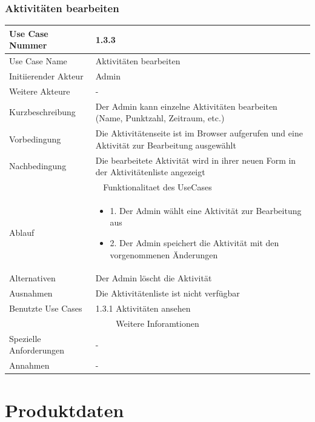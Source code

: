 \documentclass[10pt,a4paper]{article}
\begin{document}
	\subsubsection{Aktivit\"aten bearbeiten}
	\begin{tabular}{|l|p{.5\linewidth}|}
	\hline Use Case Nummer & 1.3.3 \\ 
	\hline Use Case Name & Aktivit\"aten bearbeiten \\ 
	\hline Initiierender Akteur & Admin \\
	\hline Weitere Akteure & - \\
	\hline Kurzbeschreibung & Der Admin kann einzelne Aktivit\"aten bearbeiten (Name, Punktzahl, Zeitraum, etc.) \\
	\hline Vorbedingung & Die Aktivit\"atenseite ist im Browser aufgerufen und eine Aktivit\"at zur Bearbeitung ausgew\"ahlt \\
	\hline Nachbedingung & Die bearbeitete Aktivit\"at wird in ihrer neuen Form in der Aktivit\"atenliste angezeigt \\
	\hline \multicolumn{2}{|c|}{Funktionalitaet des UseCases}\\
	\hline Ablauf & \begin{itemize}
			\item 1. Der Admin w\"ahlt eine Aktivit\"at zur Bearbeitung aus
			\item 2. Der Admin speichert die Aktivit\"at mit den vorgenommenen \"Anderungen
		\end{itemize} \\
	\hline Alternativen & Der Admin l\"oscht die Aktivit\"at \\
	\hline Ausnahmen & Die Aktivit\"atenliste ist nicht verf\"ugbar \\
	\hline Benutzte Use Cases & 1.3.1 Aktivit\"aten ansehen \\
	\hline \multicolumn{2}{|c|}{Weitere Inforamtionen} \\
	\hline Spezielle Anforderungen & - \\
	\hline Annahmen & - \\
	\hline
	\end{tabular} 

\section{Produktdaten}

\end{document}
